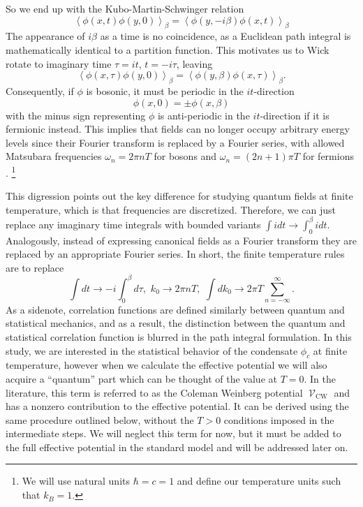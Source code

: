 \documentclass[%
 reprint,
nofootinbib,
 amsmath,amssymb,
 aps,
floatfix,
]{revtex4-1}
\DeclareMathOperator{\V}{\mathcal{V}}
\begin{document}
So we end up with the Kubo-Martin-Schwinger relation \cite{yang11}
\begin{equation}
    \left<\phi(x,t)\phi(y,0)\right>_\beta = \left<\phi(y,-i\beta)\phi(x,t)\right>_\beta
\end{equation}
The appearance of $i\beta$ as a time is no coincidence, as a Euclidean path integral is mathematically identical to a partition function.
This motivates us to Wick rotate to imaginary time $\tau=it$, $t=-i\tau$, leaving
\begin{equation}
    \left<\phi(x,\tau)\phi(y,0)\right>_\beta = \left<\phi(y,\beta)\phi(x,\tau)\right>_\beta.
\end{equation}
Consequently, if $\phi$ is bosonic, it must be periodic in the $it$-direction \cite{yang11}
\begin{equation}
    \phi(x,0) = \pm\phi(x,\beta)
\end{equation}
with the minus sign representing $\phi$ is anti-periodic in the $it$-direction if it is fermionic instead.
This implies that fields can no longer occupy arbitrary energy levels since their Fourier transform is replaced by a Fourier series, with allowed Matsubara frequencies $\omega_n = 2\pi nT$ for bosons and $\omega_n = (2n+1)\pi T$ for fermions \cite{yang11,cmr18}.
\footnote{We will use natural units $\hbar = c = 1$ and define our temperature units such that $k_B=1$.}

This digression points out the key difference for studying quantum fields at finite temperature, which is that frequencies are discretized.
Therefore, we can just replace any imaginary time integrals with bounded variants $\int idt \rightarrow \int_{0}^{\beta} idt$.
Analogously, instead of expressing canonical fields as a Fourier transform they are replaced by an appropriate Fourier series.
In short, the finite temperature rules are to replace \cite{cmr18}
\begin{equation}
    \int dt \rightarrow -i\int_0^\beta d\tau, \,\, k_0 \rightarrow 2\pi n T, \,\, \int dk_0 \rightarrow 2\pi T \sum_{n=-\infty}^{\infty}\label{eq:replacementrules}.
\end{equation}
As a sidenote, correlation functions are defined similarly between quantum and statistical mechanics, and as a result, the distinction between the quantum and statistical correlation function is blurred in the path integral formulation.
In this study, we are interested in the statistical behavior of the condensate $\phi_c$ at finite temperature, however when we calculate the effective potential we will also acquire a ``quantum'' part which can be thought of the value at $T=0$.
In the literature, this term is referred to as the Coleman Weinberg potential $\V_\text{CW}$ \cite{cw73} and has a nonzero contribution to the effective potential.
It can be derived using the same procedure outlined below, without the $T>0$ conditions imposed in the intermediate steps.
We will neglect this term for now, but it must be added to the full effective potential in the standard model and will be addressed later on.
\end{document}
